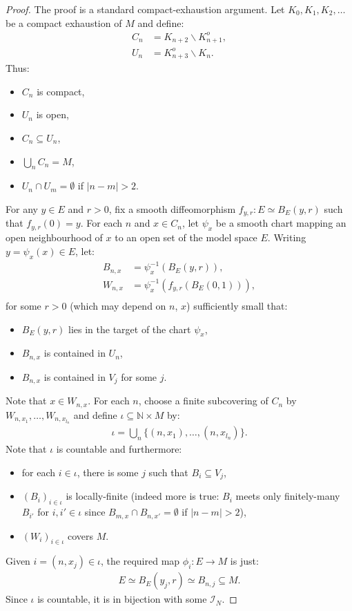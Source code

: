 \documentclass[10pt,a4paper]{article}
\newcommand{\IT}[1]{\mathcal{I}_{#1}}
\newcommand{\leanok}{}
\begin{document}
\begin{proof}
  \leanok
  The proof is a standard compact-exhaustion argument.
  Let $K_0, K_1, K_2, \ldots $ be a compact exhaustion of $M$ and define:
  \begin{align*}
    C_n &= K_{n+2} \smallsetminus K_{n+1}^o,\\
    U_n &= K_{n+3}^o \smallsetminus K_n.
  \end{align*}
  Thus:
  \begin{itemize}
    \item $C_n$ is compact,
    \item $U_n$ is open,
    \item $C_n \subseteq U_n$,
    \item $\bigcup_n C_n = M$,
    \item $U_n \cap U_m = \emptyset$ if $|n - m| > 2$.
  \end{itemize}
  For any $y \in E$ and $r > 0$, fix a smooth diffeomorphism $f_{y,r} : E \simeq B_E(y, r)$ such
  that $f_{y,r}(0) = y$.
  For each $n$ and $x \in C_n$, let $\psi_x$  be a smooth chart mapping an open
  neighbourhood of $x$ to an open set of the model space $E$.
  Writing $y = \psi_x (x) \in E$, let:
  \begin{align*}
    B_{n, x} &= \psi_x^{-1} (B_E(y, r)),\\
    W_{n, x} &= \psi_x^{-1} (f_{y,r} (B_E (0, 1))),\\
  \end{align*}
  for some $r > 0$ (which may depend on $n$, $x$) sufficiently small that:
  \begin{itemize}
    \item $B_E(y, r)$ lies in the target of the chart $\psi_x$,
    \item $B_{n,x}$ is contained in $U_n$,
    \item $B_{n,x}$ is contained in $V_j$ for some $j$.
  \end{itemize}
  Note that $x \in W_{n,x}$. For each $n$, choose a finite subcovering of $C_n$ by
  $W_{n, x_1}, \ldots, W_{n, x_{l_n}}$ and define $\iota \subseteq ℕ \times M$ by:
  \begin{align*}
    \iota = \bigcup_n \{ (n, x_1), \ldots, (n, x_{l_n}) \} .
  \end{align*}
  Note that $\iota$ is countable and furthermore:
  \begin{itemize}
    \item for each $i \in \iota$, there is some $j$ such that $B_i \subseteq V_j$,
    \item $(B_i)_{i \in \iota}$ is locally-finite
    (indeed more is true: $B_i$ meets only finitely-many $B_{i'}$ for $i, i' \in \iota$
    since $B_{m, x} \cap B_{n, x'} = \emptyset$ if $|n - m| > 2$),
    \item $(W_i)_{i \in \iota}$ covers $M$.
  \end{itemize}
  Given $i = (n, x_j) \in \iota$, the required map $\phi_i : E \to M$ is just:
  \begin{align*}
    E \simeq B_E(y_j, r) \simeq B_{n,j} \subseteq M.
  \end{align*}
  Since $ι$ is countable, it is in bijection with some $\IT{N}$.
\end{proof}
\end{document}
